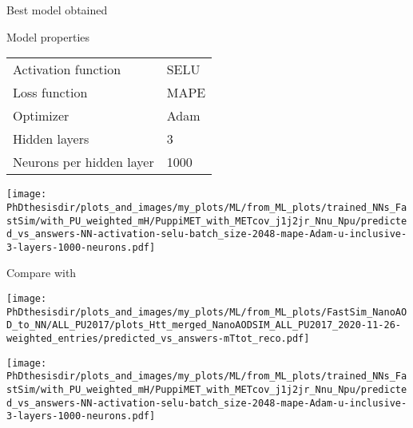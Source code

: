 \begin{frame}{Best model obtained}

\begin{minipage}[c]{.475\textwidth}
\begin{block}{Model properties}
\begin{center}
\begin{tabular}{ll}
Activation function & SELU\\
Loss function & MAPE\\
Optimizer & Adam\\
Hidden layers & 3\\
Neurons per hidden layer & 1000
\end{tabular}
\end{center}
\end{block}
\end{minipage}
\hfill
\begin{minipage}[c]{.475\textwidth}
\begin{center}\vspace{-4pt}
\texttt{[image: \\PhDthesisdir/plots\_and\_images/my\_plots/ML/from\_ML\_plots/trained\_NNs\_FastSim/with\_PU\_weighted\_mH/PuppiMET\_with\_METcov\_j1j2jr\_Nnu\_Npu/predicted\_vs\_answers-NN-activation-selu-batch\_size-2048-mape-Adam-u-inclusive-3-layers-1000-neurons.pdf]}
\end{center}\vspace{-5pt}
\end{minipage}

\end{frame}

\addtocounter{framenumber}{-1}
\begin{frame}

\vspace{-5pt}
\manip Compare with \mTtot

\vspace{5pt}

\begin{minipage}[c]{.475\textwidth}
\begin{center}\vspace{-4pt}
\texttt{[image: \\PhDthesisdir/plots\_and\_images/my\_plots/ML/from\_ML\_plots/FastSim\_NanoAOD\_to\_NN/ALL\_PU2017/plots\_Htt\_merged\_NanoAODSIM\_ALL\_PU2017\_2020-11-26-weighted\_entries/predicted\_vs\_answers-mTtot\_reco.pdf]}
\end{center}\vspace{-5pt}
\end{minipage}
\hfill
\begin{minipage}[c]{.475\textwidth}
\begin{center}\vspace{-4pt}
\texttt{[image: \\PhDthesisdir/plots\_and\_images/my\_plots/ML/from\_ML\_plots/trained\_NNs\_FastSim/with\_PU\_weighted\_mH/PuppiMET\_with\_METcov\_j1j2jr\_Nnu\_Npu/predicted\_vs\_answers-NN-activation-selu-batch\_size-2048-mape-Adam-u-inclusive-3-layers-1000-neurons.pdf]}
\end{center}\vspace{-5pt}
\end{minipage}

\end{frame}

